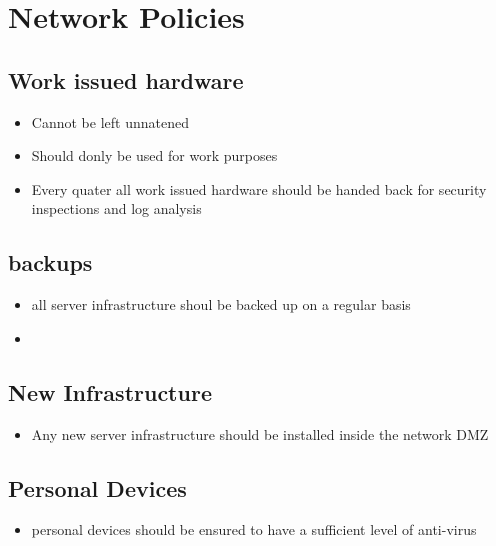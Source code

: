 \chapter{Network Policies}

\section{Work issued hardware}
\begin{itemize}
    \item Cannot be left unnatened
    \item Should donly be used for work purposes
    \item Every quater all work issued hardware should be handed back for security inspections and log analysis
\end{itemize}

\section{backups}
\begin{itemize}
    \item all server infrastructure shoul be backed up on a regular basis
    \item 
\end{itemize}

\section{New Infrastructure}
\begin{itemize}
    \item Any new server infrastructure should be installed inside the network DMZ
\end{itemize}

\section{Personal Devices}
\begin{itemize}
    \item personal devices should be ensured to have a sufficient level of anti-virus
\end{itemize}

